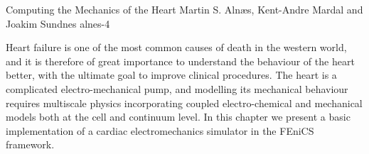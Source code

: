               {Computing the Mechanics of the Heart}
              {Martin S. Aln\ae{}s, Kent-Andre Mardal and Joakim Sundnes}
              {alnes-4}

Heart failure is one of the most common causes of death in the western
world, and it is therefore of great importance to understand the
behaviour of the heart better, with the ultimate goal to improve
clinical procedures. The heart is a complicated electro-mechanical
pump, and modelling its mechanical behaviour requires multiscale
physics incorporating coupled electro-chemical and mechanical models
both at the cell and continuum level.  In this chapter we present a
basic implementation of a cardiac electromechanics simulator in the
FEniCS framework.
